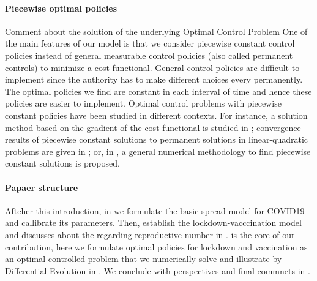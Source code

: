 \paragraph{Piecewise optimal policies}
        Comment about the solution of the underlying Optimal Control Problem
    One of the main features of our model is that we consider piecewise
    constant control policies instead of general measurable control policies
    (also called permanent controls) to minimize a cost functional. General
    control policies are difficult to implement since the authority has to make
    different choices every permanently. The optimal policies we find are
    constant in each interval of time and hence these policies are easier to
    implement.
        Optimal control problems with piecewise constant policies have been
    studied in different contexts. For instance, a solution method based on the
    gradient of the cost functional is studied in \cite{MR3223602}; convergence
    results of piecewise constant solutions to permanent solutions in
    linear-quadratic problems are given in \cite{MR3627992}; or, in
    \cite{CANTUNetAl}, a general numerical methodology to find piecewise
    constant solutions is proposed.
\paragraph{Papaer structure}
    Afteher this introduction, in  we formulate the
    basic spread model for COVID19 and callibrate its parameters. Then,
     establish the lockdown-vacccination model and
    discusses about the regarding reproductive number in
    .
     is the core of our contribution, here we
    formulate optimal policies for lockdown and vaccination as an optimal
    controlled problem that we numerically solve and illustrate  by
    Differential Evolution in .
    We conclude with perspectives and final commnets in .